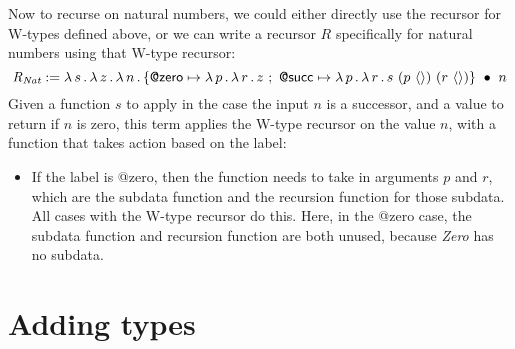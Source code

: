 \documentclass{article}
\begin{document}
\noindent Now to recurse on natural numbers, we could either directly use the recursor for W-types defined above,
or we can write a recursor $R$ specifically for natural numbers using that W-type recursor:
\[
\textit{R}_{\textit{Nat}} := \lam{s}{\lam{z}{\lam{n}{\wrec{\{\textsf{@zero} \mapsto \lam{p}{\lam{r}{z}}\ ;\ \textsf{@succ} \mapsto \lam{p}{\lam{r}{s\ (p\ \wunit)\ (r\ \wunit)}}\}}{n}}}}
\]
\noindent Given a function $s$ to apply in the case the input $n$ is a successor, and a value to return if $n$ is zero, this
term applies the W-type recursor on the value $n$, with a function that takes action based on the label:
\begin{itemize}
  \item If the label is \textsf{@zero}, then the function needs to
    take in arguments $p$ and $r$, which are the subdata function and the
    recursion function for those subdata.  All cases with the W-type recursor do this.  Here, in the \textsf{@zero} case,
    the subdata function and recursion function are both unused, because \textit{Zero} has no subdata.
\end{itemize}

\section{Adding types}



\end{document}

